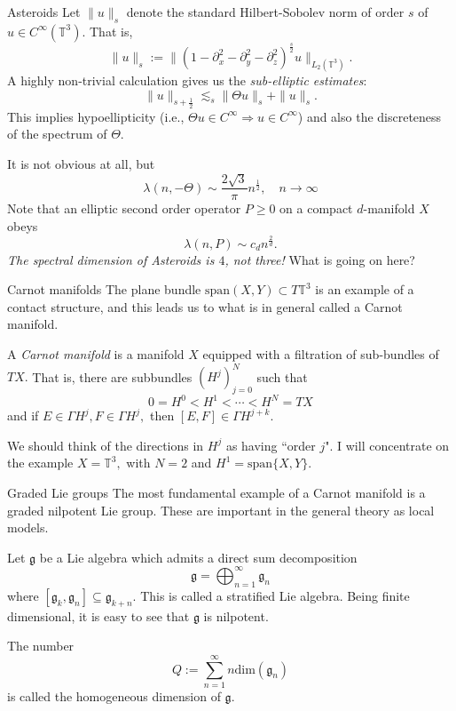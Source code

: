 \documentclass{beamer}
\numberwithin{equation}{section}
\theoremstyle{plain}
\theoremstyle{plain}
\theoremstyle{definition}
\theoremstyle{plain}
\theoremstyle{plain}
\theoremstyle{definition}
\newcommand{\Circ}{\mathbb{T}}
\newcommand{\gf}{\mathfrak{g}}
\begin{document}
\begin{frame}{Asteroids}
 Let $\|u\|_{s}$ denote the standard Hilbert-Sobolev norm of order $s$ of $u\in C^\infty(\Circ^3).$ That is,
 \[
      \|u\|_s := \|(1-\partial_x^2-\partial_y^2-\partial_z^2)^{\frac{s}{2}}u\|_{L_2(\Circ^3)}.
 \]
 A highly non-trivial calculation gives us the \emph{sub-elliptic estimates}:
  \[
      \|u\|_{s+\frac12}\lesssim_s \|\Theta u\|_s+\|u\|_s.
  \]
  This implies hypoellipticity (i.e., $\Theta u\in C^\infty \Rightarrow u \in C^\infty$) and also the discreteness of the spectrum of $\Theta.$
\end{frame}

\begin{frame}
  It is not obvious at all, but
  \[
    \lambda(n,-\Theta) \sim \frac{2\sqrt{3}}{\pi} n^{\frac{1}{2}},\quad n\to\infty
  \]
  Note that an elliptic second order operator $P\geq 0$ on a compact $d$-manifold $X$ obeys
  \[
    \lambda(n,P) \sim c_d n^{\frac{2}{d}}.
  \]
  \emph{The spectral dimension of Asteroids is $4$, not three!}
  \pause
  What is going on here?
\end{frame}

\begin{frame}{Carnot manifolds}
  The plane bundle $\mathrm{span}(X,Y)\subset T\Circ^3$ is an example of a contact structure, and this leads us to what is in general called a Carnot manifold.
  \begin{definition}
    A \emph{Carnot manifold} is a manifold $X$ equipped with a filtration of sub-bundles of $TX.$ That is, there are subbundles $(H^j)_{j=0}^N$ such that
    \[
      0 = H^0 < H^1 < \cdots < H^N = TX
    \]
    and if $E\in \Gamma H^j, F\in \Gamma H^j,$ then $[E,F] \in \Gamma H^{j+k}.$
  \end{definition}
  We should think of the directions in $H^j$ as having ``order $j$".
  \pause
  I will concentrate on the example $X = \Circ^3,$ with $N=2$ and $H^1 = \mathrm{span}\{X,Y\}.$
\end{frame}


\begin{frame}{Graded Lie groups}
  The most fundamental example of a Carnot manifold is a graded nilpotent Lie group. These are important in the general theory as local models.

  Let $\gf$ be a Lie algebra which admits a direct sum decomposition
  \[
    \gf = \bigoplus_{n=1}^\infty \gf_n
  \]
  where $[\gf_k,\gf_n] \subseteq \gf_{k+n}.$ This is called a stratified Lie algebra. Being finite dimensional, it is easy to see that $\gf$ is nilpotent.

  The number
  \[
    Q := \sum_{n=1}^\infty n\mathrm{dim}(\gf_n)
  \]
  is called the homogeneous dimension of $\gf.$
\end{frame}
\end{document}
